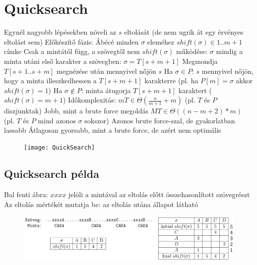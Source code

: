 \documentclass[12pt,a4paper]{article}
\begin{document}
\pagebreak

\section{Quicksearch}

\begin{outline}
	\1 Egynél nagyobb lépésekben növeli az $s$ eltolását (de nem ugrik át egy érvényes eltolást sem)
	\1 Előkészítő fázis: Ábécé minden $\sigma$ eleméhez $shift(\sigma) \in 1..m+1$ címke
		\2 Csak a mintától függ, a szövegtől nem
	\1 $shift(\sigma)$ működése:
		\2 $\sigma$ mindig a minta utáni első karakter a szövegben: $\sigma = T[s+m+1]$
		\2 Megmondja $T[s+1..s+m]$ megnézése után mennyivel nőjön $s$
		\2 Ha $\sigma \in P$: $s$ mennyivel nőjön, hogy a minta illeszkedhessen a $T[s+m+1]$ karakterre (pl. ha $P[m]=\sigma$ akkor $shift(\sigma)=1$)
		\2 Ha $\sigma \notin P$: minta átugorja $T[s+m+1]$ karaktert ($shift(\sigma) = m+1$)
	\1 Időkomplexitás:
		\2 $mT \in \Theta(\frac{n}{m+1}+m)$ (pl. $T$ és $P$ diszjunktak)
			\3 Jobb, mint a brute force megoldás
		\2 $MT \in \Theta((n-m+2)*m)$ (pl. $T$ és $P$ mind azonos $\sigma$ sokszor)
			\3 Azonos brute force-szal, de gyakorlatban lassabb
		\2 Átlagosan gyorsabb, mint a brute force, de azért nem optimális
\end{outline}

\begin{figure}[h!]
	\centering
	\texttt{[image: QuickSearch]}
\end{figure}

\pagebreak

\subsection{Quicksearch példa}

\begin{outline}
	\1 Bal fenti ábra:
		\2 $xxxx$ jelöli a mintával az eltolás előtt összehasonlított szövegrészt
		\2 Az eltolás mértékét mutatja be: az eltolás utána állapot látható
\end{outline}

\begin{figure}[h!]
	\centering
	\includegraphics[width=1\linewidth]{QuickSearch-példa-shift}
\end{figure}
\end{document}
